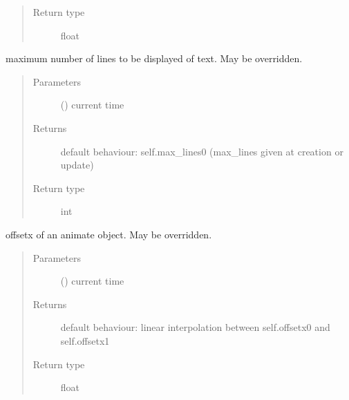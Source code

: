\documentclass[letterpaper,10pt,english]{sphinxmanual}
\begin{document}
\begin{fulllineitems}
\begin{fulllineitems}
\begin{quote}
\begin{description}
\item[{Return type}] \leavevmode
float

\end{description}\end{quote}

\end{fulllineitems}


\begin{fulllineitems}
\label{\detokenize{Reference:salabim.Animate.max_lines}}
maximum number of lines to be displayed of text. May be overridden.
\begin{quote}\begin{description}
\item[{Parameters}] \leavevmode
{} () \textendash{} current time

\item[{Returns}] \leavevmode
{} \textendash{} default behaviour: self.max\_lines0 (max\_lines given at creation or update)

\item[{Return type}] \leavevmode
int

\end{description}\end{quote}

\end{fulllineitems}


\begin{fulllineitems}
\label{\detokenize{Reference:salabim.Animate.offsetx}}
offsetx of an animate object. May be overridden.
\begin{quote}\begin{description}
\item[{Parameters}] \leavevmode
{} () \textendash{} current time

\item[{Returns}] \leavevmode
{} \textendash{} default behaviour: linear interpolation between self.offsetx0 and self.offsetx1

\item[{Return type}] \leavevmode
float


\end{description}
\end{quote}
\end{fulllineitems}
\end{fulllineitems}
\end{document}
